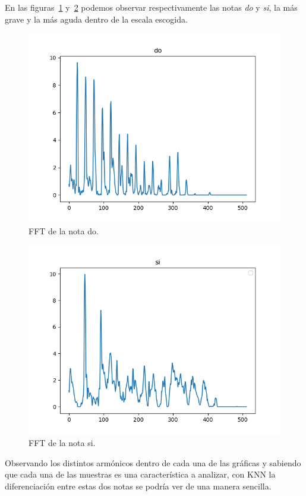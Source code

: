 \documentclass[a4paper, 12pt]{book}
\begin{document}
En las figuras~\ref{fig:do} y~\ref{fig:si} podemos observar respectivamente las notas \textit{do} y \textit{si}, la más grave y la más aguda dentro de la escala escogida.

\begin{figure}
	\centering
	\includegraphics[width=12cm]{img/do.png}
	\caption{FFT de la nota do.}\label{fig:do}
\end{figure}

\begin{figure}
	\centering
	\includegraphics[width=12cm]{img/si.png}
	\caption{FFT de la nota si.}\label{fig:si}
\end{figure}

Observando los distintos armónicos dentro de cada una de las gráficas y sabiendo que cada una de las muestras es una característica a analizar, con KNN la diferenciación entre estas dos notas se podría ver de una manera sencilla.
\end{document}
